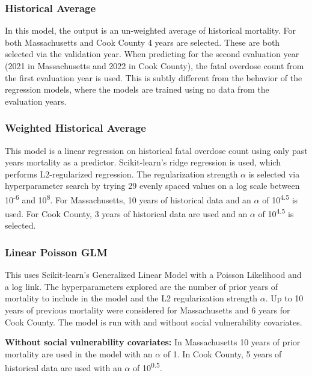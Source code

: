\subsubsection{Historical Average}\label{historical-average}

In this model, the output is an un-weighted average of historical mortality. For both Massachusetts and Cook County 4 years are selected. These are both selected via the validation year. When predicting for the second evaluation year (2021 in Massachusetts and 2022 in Cook County), the fatal overdose count from the first evaluation year is used. This is subtly different from the behavior of the regression models, where the models are trained using no data from the evaluation years.

\subsubsection{Weighted Historical Average}\label{weighted-historical-average}

This model is a linear regression on historical fatal overdose count using only past years mortality as a predictor. Scikit-learn's \citep{buitinckAPIDesignMachine2013} ridge regression is used, which performs L2-regularized regression. The regularization strength $\alpha$ is selected via hyperparameter search by trying 29 evenly spaced values on a log scale between 10\textsuperscript{-6} and 10\textsuperscript{8}. For Massachusetts, 10 years of historical data and an $\alpha$ of 10\textsuperscript{4.5} is used. For Cook County, 3 years of historical data are used and an $\alpha$ of 10\textsuperscript{4.5} is selected.

\subsubsection{Linear Poisson GLM}\label{linear-poisson-glm}

This uses Scikit-learn's \citep{buitinckAPIDesignMachine2013} Generalized Linear Model with a Poisson Likelihood and a log link. The hyperparameters explored are the number of prior years of mortality to include in the model and the L2 regularization strength $\alpha$. Up to 10 years of previous mortality were considered for Massachusetts and 6 years for Cook County. The model is run with and without social vulnerability covariates.

\textbf{Without social vulnerability covariates:} In Massachusetts 10 years of prior mortality are used in the model with an $\alpha$ of 1. In Cook County, 5 years of historical data are used with an $\alpha$ of 10\textsuperscript{0.5}.

